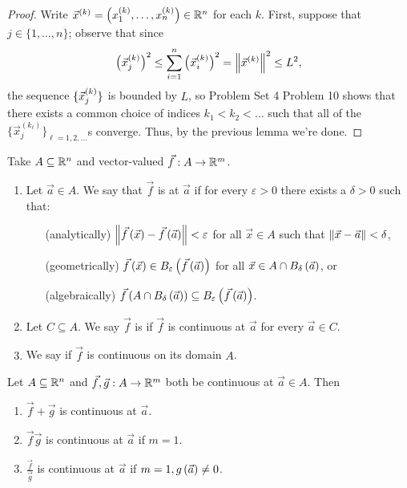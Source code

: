 \documentclass[main.tex]{subfiles}
\begin{document}
\begin{proof}
    Write $\vec{x}^{(k)} = \left( x ^{(k)}_1, \ldots , x ^{(k)}_n \right)\in \mathbb R^n$ for each $k$. First, suppose that $j\in \{1, \ldots , n\}$; observe that since
    \[\left( \vec{x}^{(k)}_j \right)^2 \le \sum_{i = 1}^n \left( \vec{x}^{(k)}_i \right)^2 = \left\lVert \vec{x}^{(k)} \right\rVert^2 \le L^2,\]
    the sequence $\{\vec{x}^{(k)}_j\}$ is bounded by $L$, so Problem Set 4 Problem 10 shows that there exists a common choice of indices $k_1 < k_2 < \ldots$ such that all of the $\{\vec{x}_j^{(k_\ell)}\}_{\ell = 1, 2, \ldots}$s converge. Thus, by the previous lemma we're done.
\end{proof}

\begin{definition}[Continuity]
    Take $A\subseteq \mathbb R^n$ and vector-valued $\vec{f} : A\to \mathbb R^m$.
    \begin{enumerate}
        \item Let $\vec{a}\in A$. We say that $\vec{f}$ is  at $\vec{a}$ if for every $\varepsilon > 0$ there exists a $\delta > 0$ such that:
        \begin{itemize}
            \item[(analytically)] $\left\lVert \vec{f}\left( \vec{x} \right) - \vec{f}\left( \vec{a} \right) \right\rVert < \varepsilon$ for all $\vec{x}\in A$ such that $\left\lVert \vec{x} - \vec{a} \right\rVert < \delta$,
            \item[(geometrically)] $\vec{f}\left( \vec{x} \right) \in B_\varepsilon\left( \vec{f}\left( \vec{a} \right) \right)$ for all $\vec{x}\in A\cap B_\delta\left( \vec{a} \right)$, or
            \item[(algebraically)] $\vec{f}\left( A\cap B_\delta\left( \vec{a} \right) \right)\subseteq B_\varepsilon\left( \vec{f}\left( \vec{a} \right) \right)$.
        \end{itemize}
        \item Let $C\subseteq A$. We say $\vec{f}$ is  if $\vec{f}$ is continuous at $\vec{a}$ for every $\vec{a}\in C$.
        \item We say  if $\vec{f}$ is continuous on its domain $A$.
    \end{enumerate}
\end{definition}

\begin{lemma}
    Let $A\subseteq \mathbb R^n$ and $\vec{f}, \vec{g} : A\to \mathbb R^m$ both be continuous at $\vec{a}\in A$. Then
    \begin{enumerate}
        \item $\vec{f} + \vec{g}$ is continuous at $\vec{a}$.
        \item $\vec{f}\vec{g}$ is continuous at $\vec{a}$ if $m = 1$.
        \item $\frac{\vec{f}}{\vec{g}}$ is continuous at $\vec{a}$ if $m = 1, g\left( \vec{a} \right)\neq 0$.
    \end{enumerate}
\end{lemma}
\end{document}
